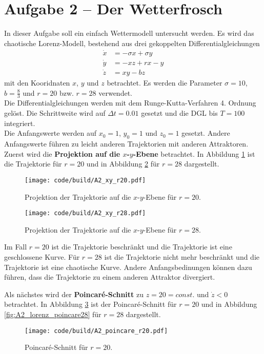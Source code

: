\section{Aufgabe 2 – Der Wetterfrosch}
\label{sec:A2}
In dieser Aufgabe soll ein einfach Wettermodell untersucht werden.
Es wird das chaotische Lorenz-Modell, bestehend aus drei gekoppelten Differentialgleichungen
\begin{align}
    \dot{x} &= -\sigma x + \sigma y \\
    \dot{y} &= -x z + r x - y \\
    \dot{z} &= x y - b z
\end{align}
mit den Kooridnaten $x$, $y$ und $z$ betrachtet.
Es werden die Parameter $\sigma = 10$, $b = \frac{8}{3}$ und $r = 20$ bzw. $r = 28$ verwendet.
\\
Die Differentialgleichungen werden mit dem Runge-Kutta-Verfahren 4. Ordnung gelöst.
Die Schrittweite wird auf $\Delta t = 0.01$ gesetzt und die DGL bis $T = 100$ integriert.
\\
Die Anfangswerte werden auf $x_0 = 1$, $y_0 = 1$ und $z_0 = 1$ gesetzt.
Andere Anfangswerte führen zu leicht anderen Trajektorien mit anderen Attraktoren.
\\
Zuerst wird die \textbf{Projektion auf die $x$-$y$-Ebene} betrachtet.
In Abbildung \ref{fig:A2_lorenz_xy20} ist die Trajektorie für $r = 20$ und in Abbildung \ref{fig:A2_lorenz_xy28} für $r = 28$ dargestellt.
\begin{figure}
    \centering
    \texttt{[image: code/build/A2\_xy\_r20.pdf]}
    \caption{Projektion der Trajektorie auf die $x$-$y$-Ebene für $r = 20$.}
    \label{fig:A2_lorenz_xy20}
\end{figure}

\begin{figure}
    \centering
    \texttt{[image: code/build/A2\_xy\_r28.pdf]}
    \caption{Projektion der Trajektorie auf die $x$-$y$-Ebene für $r = 28$.}
    \label{fig:A2_lorenz_xy28}
\end{figure}
Im Fall $r=20$ ist die Trajektorie beschränkt und die Trajektorie ist eine geschlossene Kurve.
Für $r=28$ ist die Trajektorie nicht mehr beschränkt und die Trajektorie ist eine chaotische Kurve.
Andere Anfangsbedinungen können dazu führen, dass die Trajektorie zu einem anderen Attraktor divergiert.
\FloatBarrier

Als nächstes wird der \textbf{Poincaré-Schnitt} zu $z = 20 = const.$ und $\dot{z} < 0$ betrachtet.
In Abbildung \ref{fig:A2_lorenz_poincare20} ist der Poincaré-Schnitt für $r = 20$ und in Abbildung \ref{fig:A2_lorenz_poincare28} für $r = 28$ dargestellt.
\begin{figure}
    \centering
    \texttt{[image: code/build/A2\_poincare\_r20.pdf]}
    \caption{Poincaré-Schnitt für $r = 20$.}
    \label{fig:A2_lorenz_poincare20}
\end{figure}

